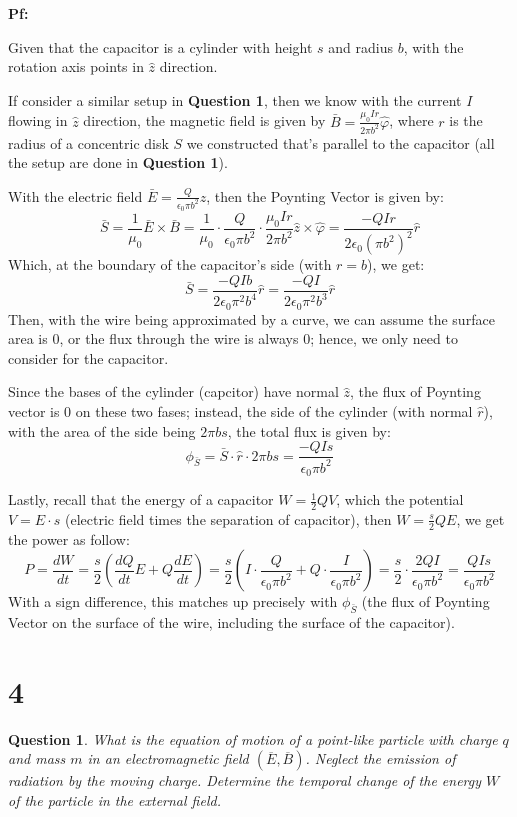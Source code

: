 \documentclass{article}
\newtheorem{question}{Question}
\begin{document}
\textbf{Pf:}

Given that the capacitor is a cylinder with height $s$ and radius $b$, with the rotation axis points in $\hat{z}$ direction.

If consider a similar setup in \textbf{Question 1}, then we know with the current $I$ flowing in $\hat{z}$ direction, 
the magnetic field is given by $\bar{B}=\frac{\mu_0Ir}{2\pi b^2}\hat{\varphi}$, where $r$ is the radius of a concentric disk $S$
we constructed that's parallel to the capacitor (all the setup are done in \textbf{Question 1}).

With the electric field $\bar{E}=\frac{Q}{\epsilon_0\pi b^2}\hat{z}$, then the Poynting Vector is given by:
$$\bar{S}=\frac{1}{\mu_0}\bar{E}\times \bar{B} = \frac{1}{\mu_0}\cdot \frac{Q}{\epsilon_0\pi b^2}\cdot \frac{\mu_0Ir}{2\pi b^2}\hat{z}\times \hat{\varphi} = \frac{-QIr}{2\epsilon_0 (\pi b^2)^2}\hat{r}$$
Which, at the boundary of the capacitor's side (with $r=b$), we get:
$$\bar{S}=\frac{-QIb}{2\epsilon_0\pi^2b^4}\hat{r} = \frac{-QI}{2\epsilon_0 \pi^2b^3}\hat{r}$$
Then, with the wire being approximated by a curve, we can assume the surface area is $0$, or the flux through the wire is always $0$; hence, we only need to consider for the capacitor.

Since the bases of the cylinder (capcitor) have normal $\hat{z}$, the flux of Poynting vector is $0$ on these two fases;
instead, the side of the cylinder (with normal $\hat{r}$), with the area of the side being $2\pi bs$, the total flux is given by:
$$\phi_{\bar{S}} = \bar{S}\cdot \hat{r}\cdot 2\pi bs = \frac{-QIs}{\epsilon_0 \pi b^2}$$

Lastly, recall that the energy of a capacitor $W=\frac{1}{2}QV$, which the potential $V=E\cdot s$ (electric field times the separation of capacitor),
then $W=\frac{s}{2}QE$, we get the power as follow:
$$P=\frac{dW}{dt} = \frac{s}{2}\left(\frac{dQ}{dt}E+Q\frac{dE}{dt}\right)=\frac{s}{2}\left(I\cdot \frac{Q}{\epsilon_0\pi b^2}+Q\cdot \frac{I}{\epsilon_0\pi b^2}\right) = \frac{s}{2}\cdot \frac{2QI}{\epsilon_0 \pi b^2} = \frac{QIs}{\epsilon_0\pi b^2}$$
With a sign difference, this matches up precisely with $\phi_{\bar{S}}$ (the flux of Poynting Vector on the surface of the wire, including the surface of the capacitor).

\break

\section*{4}
\begin{myBox}[]{}
    \begin{question}
        What is the equation of motion of a point-like particle with charge $q$ and mass $m$ in an
        electromagnetic field $(\overline{E},\overline{B})$. Neglect the emission of radiation by the moving charge. 
        Determine the temporal change of the energy $W$ of the particle in the external field.
    \end{question}
\end{myBox}
\end{document}
